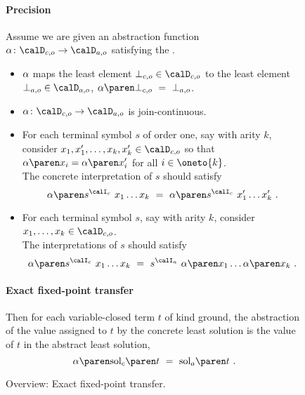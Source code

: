 \documentclass[../../diss.tex]{subfiles}
\begin{document}
\begin{figure}
{{\begin{minipage}{\textwidth-2.5em}
            \paragraph{Precision}
            Assume we are given an abstraction function $\abs \colon \domainc{\ground} \to \domaina{\ground}$ satisfying the .
            \begin{itemize}
                \item
                    $\abs$ maps the least element $\botc{\ground} \in \domainc{\ground}$ to the least element $\bota{\ground} \in \domaina{\ground}$, $\abs{\botc{\ground}} \ = \  \bota{\ground}$.
                \item
                    $\abs \colon \domainc{\ground} \to \domaina{\ground}$ is join-continuous.
                \item
                    For each terminal symbol $s$ of order one, say with arity $k$, consider $x_1, x_1', \ldots, x_k, x_k' \in \domainc{\ground}$ so that $\abs{x_i} = \abs{x_i'}$ for all $i \in \oneto{k}$.
                    \\
                    The concrete interpretation of $s$ should satisfy
                    \[
                        \abs{ s^{\interpretationc} \appl x_1 \ldots x_k }
                        \ = \
                        \abs{ s^{\interpretationc} \appl x_1' \ldots x_k' }
                        \ .
                    \]
                \item
                    For each terminal symbol $s$, say with arity $k$, consider $x_1, \ldots, x_k \in \domainc{\ground}$.
                    \\
                    The interpretations of $s$ should satisfy
                    \[
                        \abs{ s^{\interpretationc} \appl x_1 \ldots x_k }
                        \ = \
                        s^{\interpretationa} \appl \abs{x_1} \ldots \abs{x_k}
                        \ .
                    \]
            \end{itemize}

            \paragraph{Exact fixed-point transfer}
            Then for each variable-closed term $t$ of kind ground, the abstraction of the value assigned to $t$ by the concrete least solution is the value of $t$ in the abstract least solution,
            \[
                \abs{\solc{t}} \ = \ \sola{t}
                \ .
            \]
            \vspace*{0.1em}
        \end{minipage}
    }
    }
    \caption{Overview: Exact fixed-point transfer.}%
    \label{Figure:HORSEFPTCheatSheet}%
\end{figure}
\end{document}
